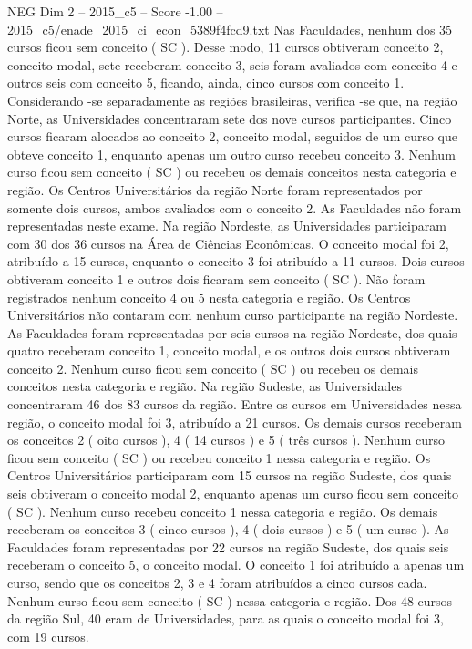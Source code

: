 \begin{textsample}{NEG Dim 2 – 2015\_c5 – Score -1.00 – 2015\_c5/enade\_2015\_ci\_econ\_5389f4fcd9.txt}
Nas Faculdades, nenhum dos 35 cursos ficou sem conceito ( SC ).
Desse modo, 11 cursos obtiveram conceito 2, conceito modal, sete receberam conceito 3, seis foram avaliados com conceito 4 e outros seis com conceito 5, ficando, ainda, cinco cursos com conceito 1.
Considerando -se separadamente as regiões brasileiras, verifica -se que, na região Norte, as Universidades concentraram sete dos nove cursos participantes.
Cinco cursos ficaram alocados ao conceito 2, conceito modal, seguidos de um curso que obteve conceito 1, enquanto apenas um outro curso recebeu conceito 3.
Nenhum curso ficou sem conceito ( SC ) ou recebeu os demais conceitos nesta categoria e região.
Os Centros Universitários da região Norte foram representados por somente dois cursos, ambos avaliados com o conceito 2.
As Faculdades não foram representadas neste exame.
Na região Nordeste, as Universidades participaram com 30 dos 36 cursos na Área de Ciências Econômicas.
O conceito modal foi 2, atribuído a 15 cursos, enquanto o conceito 3 foi atribuído a 11 cursos.
Dois cursos obtiveram conceito 1 e outros dois ficaram sem conceito ( SC ).
Não foram registrados nenhum conceito 4 ou 5 nesta categoria e região.
Os Centros Universitários não contaram com nenhum curso participante na região Nordeste.
As Faculdades foram representadas por seis cursos na região Nordeste, dos quais quatro receberam conceito 1, conceito modal, e os outros dois cursos obtiveram conceito 2.
Nenhum curso ficou sem conceito ( SC ) ou recebeu os demais conceitos nesta categoria e região.
Na região Sudeste, as Universidades concentraram 46 dos 83 cursos da região.
Entre os cursos em Universidades nessa região, o conceito modal foi 3, atribuído a 21 cursos.
Os demais cursos receberam os conceitos 2 ( oito cursos ), 4 ( 14 cursos ) e 5 ( três cursos ).
Nenhum curso ficou sem conceito ( SC ) ou recebeu conceito 1 nessa categoria e região.
Os Centros Universitários participaram com 15 cursos na região Sudeste, dos quais seis obtiveram o conceito modal 2, enquanto apenas um curso ficou sem conceito ( SC ).
Nenhum curso recebeu conceito 1 nessa categoria e região.
Os demais receberam os conceitos 3 ( cinco cursos ), 4 ( dois cursos ) e 5 ( um curso ).
As Faculdades foram representadas por 22 cursos na região Sudeste, dos quais seis receberam o conceito 5, o conceito modal.
O conceito 1 foi atribuído a apenas um curso, sendo que os conceitos 2, 3 e 4 foram atribuídos a cinco cursos cada.
Nenhum curso ficou sem conceito ( SC ) nessa categoria e região.
Dos 48 cursos da região Sul, 40 eram de Universidades, para as quais o conceito modal foi 3, com 19 cursos.

\end{textsample}

